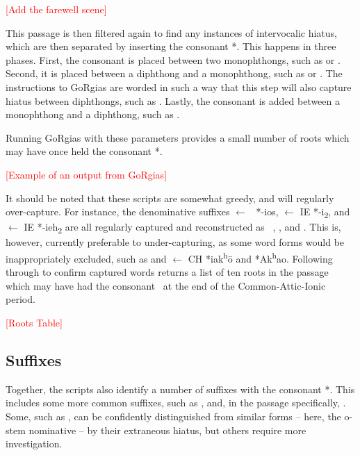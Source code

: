 \textcolor{red}{[Add the farewell scene]}

This passage
is then filtered again to find any instances of intervocalic hiatus, which
are then separated by inserting the consonant *\w. This happens in three
phases. First, the consonant is placed between two monophthongs, such as
 or . Second, it is placed between a diphthong and
a monophthong, such as  or .
The instructions to GoRgias are worded in such a way that this step will also
capture hiatus between diphthongs, such as .
Lastly, the consonant is added between a monophthong and a diphthong, such
as .

Running GoRgias with these parameters provides a small number of roots
which may have once held the consonant *\w.

\textcolor{red}{[Example of an output from GoRgias]}

It should be noted that these scripts are somewhat greedy, and will regularly
over-capture. For instance, the denominative suffixes  $\gets$
\IE\ *-ios,  $\gets$ IE *-i\textsubscript{2}, and
 $\gets$ IE *-ieh\textsubscript{2} are all regularly captured and
reconstructed as \CH\ , , and .
This is, however, currently preferable to under-capturing, as some word forms
would be inappropriately excluded, such as  and 
$\gets$ CH *\w i\w ak\textsuperscript{h}\=o and
*Ak\textsuperscript{h}a\textsubarch{\textsci}o\textsubarch{\textsci}. Following
through to confirm captured words returns a list of ten roots in the passage
which may have
had the consonant \w\ at the end of the Common-Attic-Ionic period.

\textcolor{red}{[Roots Table]}
%

\subsection{Suffixes}\label{subsec:Suffixes}
Together, the scripts also identify a number of suffixes with the consonant *\w.
This includes some more common suffixes, such as , and,
in the passage specifically, .
Some, such as , can be confidently distinguished from similar forms --
here, the o-stem nominative  -- by their extraneous hiatus,
but others require more investigation.

